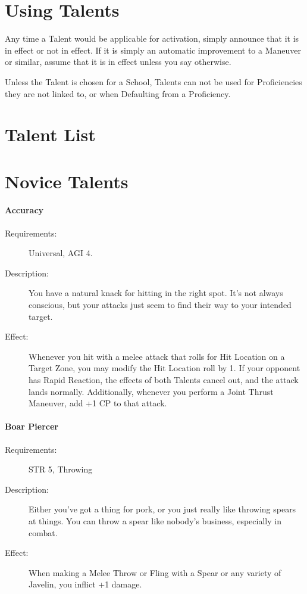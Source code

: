 \documentclass[oneside,11pt,english]{book}
\begin{document}
\section{Using Talents}
Any time a Talent would be applicable for activation, simply announce that it is in effect or not in effect.
If it is simply an automatic improvement to a Maneuver or similar, assume that it is in effect unless you say otherwise. 

Unless the Talent is chosen for a School, Talents can not be used for Proficiencies they are not linked to, or when Defaulting from a Proficiency. 

\section*{Talent List}
\section{Novice Talents}\label{sec:Novice Talents}
\paragraph{Accuracy}\label{talent:Accuracy}
\begin{description}
	\item [Requirements:] Universal, AGI 4. 
	\item [Description:] You have a natural knack for hitting in the right spot. It's not always conscious, but your 
	attacks just seem to find their way to your intended target. 
	\item [Effect:] Whenever you hit with a melee attack that rolls for Hit Location on a Target Zone, you may modify the Hit Location roll by 1. If your opponent has Rapid Reaction, the effects of both Talents cancel 
	out, and the attack lands normally. 
	Additionally, whenever you perform a Joint Thrust Maneuver, add +1 CP to that attack. 
\end{description}
\paragraph{Boar Piercer}\label{talent:Boar Piercer}
\begin{description}
	\item [Requirements:] STR 5, Throwing 
	\item [Description:] Either you’ve got a thing for pork, or you just really like throwing spears at things. You can 
	throw a spear like nobody’s business, especially in combat. 
	\item [Effect:] When making a Melee Throw or Fling with a Spear or any variety of Javelin, you inflict +1 
	damage. 
\end{description}
\end{document}
